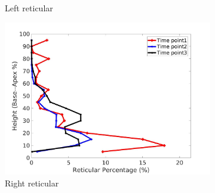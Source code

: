 \begin{figure}[H]
\begin{subfigure}{.42\linewidth}
  \caption{Left reticular}
  \label{fig:IPF15DiseaseAgainstHeight-c} 
\end{subfigure} 
\begin{subfigure}{.42\linewidth}%
  \includegraphics[width=\linewidth,trim={{.0\wd0} {.0\wd0} {.0\wd0} {.0\wd0}},clip]{Appendix/Image_AppexA/BaseToApex/IPF15RightLungReticularDiseaseAgainstHeight.jpg}
  \caption{Right reticular}
  \label{fig:IPF15DiseaseAgainstHeight-d}
\end{subfigure}
\begin{subfigure}{.42\linewidth}%

\end{subfigure}
\end{figure}
